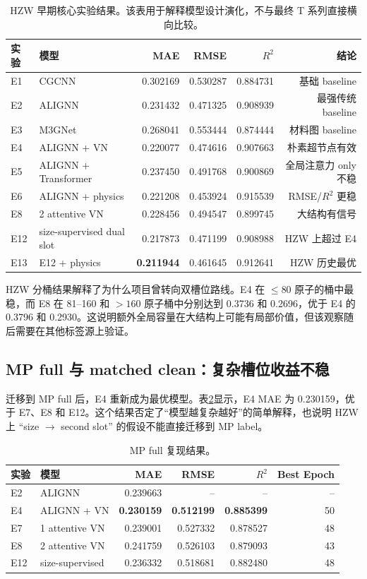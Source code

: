 \documentclass[UTF8,a4paper,11pt]{ctexart}
\newcommand{\rdsq}{R^2}
\newcommand{\NA}{--}
\begin{document}
\begin{table}[htbp]
\centering
\caption{HZW 早期核心实验结果。该表用于解释模型设计演化，不与最终 T 系列直接横向比较。}
\label{tab:hzw-early}
\small
\begin{tabular}{l l r r r r}
\toprule
实验 & 模型 & MAE & RMSE & $\rdsq$ & 结论 \\
\midrule
E1 & CGCNN & 0.302169 & 0.530287 & 0.884731 & 基础 baseline \\
E2 & ALIGNN & 0.231432 & 0.471325 & 0.908939 & 最强传统 baseline \\
E3 & M3GNet & 0.268041 & 0.553444 & 0.874444 & 材料图 baseline \\
E4 & ALIGNN + VN & 0.220077 & 0.474616 & 0.907663 & 朴素超节点有效 \\
E5 & ALIGNN + Transformer & 0.237450 & 0.491768 & 0.900869 & 全局注意力 only 不稳 \\
E6 & ALIGNN + physics & 0.221208 & 0.453924 & 0.915539 & RMSE/$\rdsq$ 更稳 \\
E8 & 2 attentive VN & 0.228456 & 0.494547 & 0.899745 & 大结构有信号 \\
E12 & size-supervised dual slot & 0.217873 & 0.471199 & 0.908988 & HZW 上超过 E4 \\
E13 & E12 + physics & \textbf{0.211944} & 0.461645 & 0.912641 & HZW 历史最优 \\
\bottomrule
\end{tabular}
\end{table}

HZW 分桶结果解释了为什么项目曾转向双槽位路线。E4 在 $\leq80$ 原子的桶中最稳，而 E8 在 81--160 和 $>160$ 原子桶中分别达到 0.3736 和 0.2696，优于 E4 的 0.3796 和 0.2930。这说明额外全局容量在大结构上可能有局部价值，但该观察随后需要在其他标签源上验证。

\subsection{MP full 与 matched clean：复杂槽位收益不稳}

迁移到 MP full 后，E4 重新成为最优模型。表\ref{tab:mp-full}显示，E4 MAE 为 0.230159，优于 E7、E8 和 E12。这个结果否定了“模型越复杂越好”的简单解释，也说明 HZW 上 ``size $\rightarrow$ second slot'' 的假设不能直接迁移到 MP label。

\begin{table}[htbp]
\centering
\caption{MP full 复现结果。}
\label{tab:mp-full}
\small
\begin{tabular}{l l r r r r}
\toprule
实验 & 模型 & MAE & RMSE & $\rdsq$ & Best Epoch \\
\midrule
E2 & ALIGNN & 0.239663 & \NA & \NA & \NA \\
E4 & ALIGNN + VN & \textbf{0.230159} & \textbf{0.512199} & \textbf{0.885399} & 50 \\
E7 & 1 attentive VN & 0.239001 & 0.527332 & 0.878527 & 48 \\
E8 & 2 attentive VN & 0.241759 & 0.526103 & 0.879093 & 43 \\
E12 & size-supervised & 0.236332 & 0.518681 & 0.882480 & 48 \\
\bottomrule
\end{tabular}
\end{table}
\end{document}
